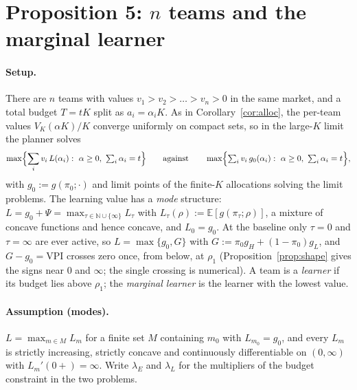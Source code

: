 \documentclass[11pt]{article}
\theoremstyle{definition}
\theoremstyle{remark}
\newcommand{\E}{\mathbb{E}}
\newcommand{\VPI}{\mathrm{VPI}}
\begin{document}
\section{Proposition 5: $n$ teams and the marginal learner}\label{sec:nteams}

\paragraph{Setup.} There are $n$ teams with values $v_1>v_2>\dots>v_n>0$ in the same market, and a total budget
$T=tK$ split as $a_i=\alpha_iK$. As in Corollary~\ref{cor:alloc}, the per-team values $V_K(\alpha K)/K$ converge uniformly
on compact sets, so in the large-$K$ limit the planner solves
\[
\max\Bigl\{\sum_iv_i\,L(\alpha_i):\ \alpha\ge0,\ \textstyle\sum_i\alpha_i=t\Bigr\}
\qquad\text{against}\qquad
\max\Bigl\{\sum_iv_i\,g_0(\alpha_i):\ \alpha\ge0,\ \textstyle\sum_i\alpha_i=t\Bigr\},
\]
with $g_0:=g(\pi_0;\cdot)$ and limit points of the finite-$K$ allocations solving the limit problems. The learning value has
a \emph{mode} structure: $L=g_0+\Psi=\max_{\tau\in\mathbb N\cup\{\infty\}}L_\tau$ with $L_\tau(\rho):=\E[g(\pi_\tau;\rho)]$, a
mixture of concave functions and hence concave, and $L_0=g_0$. At the baseline only $\tau=0$ and $\tau=\infty$ are ever
active, so $L=\max\{g_0,G\}$ with $G:=\pi_0g_H+(1-\pi_0)g_L$, and $G-g_0=\VPI$ crosses zero once, from below, at $\rho_1$
(Proposition~\ref{prop:shape} gives the signs near $0$ and $\infty$; the single crossing is numerical). A team is a
\emph{learner} if its budget lies above $\rho_1$; the \emph{marginal learner} is the learner with the lowest value.

\paragraph{Assumption (modes).} $L=\max_{m\in M}L_m$ for a finite set $M$ containing $m_0$ with $L_{m_0}=g_0$, and every
$L_m$ is strictly increasing, strictly concave and continuously differentiable on $(0,\infty)$ with $L_m'(0+)=\infty$.
Write $\lambda_E$ and $\lambda_L$ for the multipliers of the budget constraint in the two problems.
\end{document}

